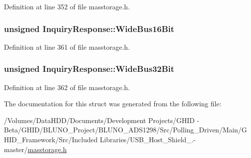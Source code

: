 \-Definition at line 352 of file masstorage.\-h.

\hypertarget{struct_inquiry_response_a39a63fd0fd92c50370af9aefe93c13cf}{
\subsubsection[{\-Wide\-Bus16\-Bit}]{\setlength{\rightskip}{0pt plus 5cm}unsigned {\bf \-Inquiry\-Response\-::\-Wide\-Bus16\-Bit}}}\label{struct_inquiry_response_a39a63fd0fd92c50370af9aefe93c13cf}


\-Definition at line 361 of file masstorage.\-h.

\hypertarget{struct_inquiry_response_a78c6cf3387430de8176b006c4915be63}{
\subsubsection[{\-Wide\-Bus32\-Bit}]{\setlength{\rightskip}{0pt plus 5cm}unsigned {\bf \-Inquiry\-Response\-::\-Wide\-Bus32\-Bit}}}\label{struct_inquiry_response_a78c6cf3387430de8176b006c4915be63}


\-Definition at line 362 of file masstorage.\-h.



\-The documentation for this struct was generated from the following file\-:\begin{DoxyCompactItemize}
\item 
/\-Volumes/\-Data\-H\-D\-D/\-Documents/\-Development Projects/\-G\-H\-I\-D -\/ Beta/\-G\-H\-I\-D/\-B\-L\-U\-N\-O\-\_\-\-Project/\-B\-L\-U\-N\-O\-\_\-\-A\-D\-S1298/\-Src/\-Polling\-\_\-\-Driven/\-Main/\-G\-H\-I\-D\-\_\-\-Framework/\-Src/\-Included Libraries/\-U\-S\-B\-\_\-\-Host\-\_\-\-Shield\-\_.-\/master/\hyperlink{masstorage_8h}{masstorage.\-h}\end{DoxyCompactItemize}
